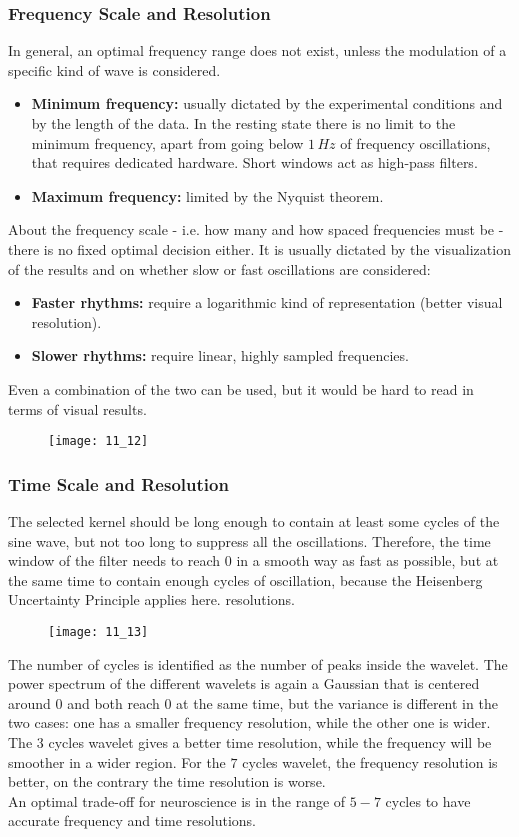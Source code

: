 \subsubsection{Frequency Scale and Resolution}
In general, an optimal frequency range does not exist, unless the modulation of a specific kind of wave is
considered.
\begin{itemize}
    \item \textbf{Minimum frequency:} usually dictated by the experimental conditions and by the length of the
    data. In the resting state there is no limit to the minimum frequency, apart from going below \(1\,Hz\)
    of frequency oscillations, that requires dedicated hardware. Short windows act as high-pass filters.
    \item \textbf{Maximum frequency:} limited by the Nyquist theorem.
\end{itemize}
About the frequency scale - i.e. how many and how spaced frequencies must be - there is no fixed optimal
decision either. It is usually dictated by the visualization of the results and on whether slow or fast
oscillations are considered:
\begin{itemize}
    \item \textbf{Faster rhythms:} require a logarithmic kind of representation (better visual resolution).
    \item \textbf{Slower rhythms:} require linear, highly sampled frequencies.
\end{itemize}
Even a combination of the two can be used, but it would be hard to read in terms of visual results.
\begin{figure}[H]
    \texttt{[image: 11\_12]}
    \centering
\end{figure}
\subsubsection{Time Scale and Resolution}
The selected kernel should be long enough to contain at least some cycles of the sine wave, but not too long
to suppress all the oscillations. Therefore, the time window of the filter needs to reach 0 in a smooth way
as fast as possible, but at the same time to contain enough cycles of oscillation, because the Heisenberg
Uncertainty Principle applies here.
resolutions.
\begin{figure}[H]
    \texttt{[image: 11\_13]}
    \centering
\end{figure}
The number of cycles is identified as the number of peaks inside the
wavelet. The power spectrum of the different wavelets is again a Gaussian that is centered around 0 and both
reach 0 at the same time, but the variance is different in the two cases: one has a smaller frequency
resolution, while the other one is wider. The \(3\) cycles wavelet gives a better time resolution, while the
frequency will be smoother in a wider region. For the \(7\) cycles wavelet, the frequency resolution is better, on
the contrary the time resolution is worse.\\
An optimal trade-off for neuroscience is in the range of \(5-7\) cycles to have accurate frequency and time
resolutions.
